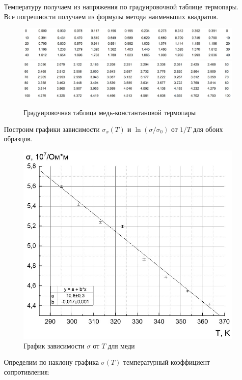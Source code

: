 \documentclass[a4paper, 12pt]{article}%
\begin{document}
Температуру получаем из напряжения по градуировочной таблице термопары. Все погрешности получаем из формулы метода наименьших квадратов.
\begin{figure}[h]
 \begin{center}
 \includegraphics[width = \textwidth]{6}
 \includegraphics[width = \textwidth]{7}
 \caption{Градуировочная таблица медь-константановой термопары}
 \end{center}
 \end{figure} 
\newpage
Построим графики зависимости $\sigma_x(T)$ и $\ln(\sigma/\sigma_0) \text{ от } 1/T$ для обоих образцов.
\begin{figure}[h]
\begin{center}
\includegraphics[width = \textwidth]{1}
\caption{График зависимости $\sigma$ от $T$ для меди}
\end{center}
\end{figure}
Определим по наклону графика $\sigma(T)$ температурный коэффициент сопротивления:
\end{document}
